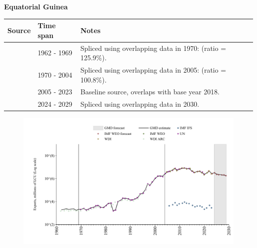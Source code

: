 \documentclass[12pt,a4paper,landscape]{article}
\begin{document}
\begin{adjustbox}{max totalsize={\paperwidth}{\paperheight},center}
\begin{minipage}[t][\textheight][t]{\textwidth}
\vspace*{0.5cm}
{}
\begin{center}
{\Large\bfseries Equatorial Guinea}
\end{center}
\vspace{0.5cm}
\begin{table}[H]
\centering
\small
\begin{tabular}{|l|l|l|}
\hline
\textbf{Source} & \textbf{Time span} & \textbf{Notes} \\
\hline
\rowcolor{white}\cite{WDI_ARC}& 1962 - 1969 &Spliced using overlapping data in 1970: (ratio = 125.9\%).\\
\rowcolor{lightgray}\cite{UN}& 1970 - 2004 &Spliced using overlapping data in 2005: (ratio = 100.8\%).\\
\rowcolor{white}\cite{WDI}& 2005 - 2023 &Baseline source, overlaps with base year 2018.\\
\rowcolor{lightgray}\cite{IMF_WEO_forecast}& 2024 - 2029 &Spliced using overlapping data in 2030.\\
\hline
\end{tabular}
\end{table}
\begin{figure}[H]
\centering
\includegraphics[width=\textwidth,height=0.6\textheight,keepaspectratio]{graphs/GNQ_exports.pdf}
\end{figure}
\end{minipage}
\end{adjustbox}
\end{document}
